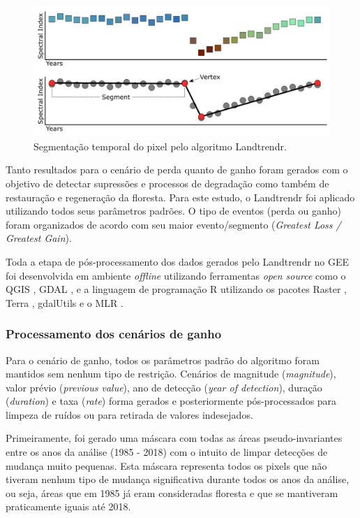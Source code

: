\begin{figure}[h!]
    \centering
    \includegraphics[scale=.8]{images/landtrendr_graphic.png}
    \caption{Segmentação temporal do pixel pelo algoritmo Landtrendr.}
    \label{fig:landtrendr_graph}
\end{figure}

Tanto resultados para o cenário de perda quanto de ganho foram gerados com o objetivo de detectar supressões e processos de degradação como também de restauração e regeneração da floresta. Para este estudo, o Landtrendr foi aplicado utilizando todos seus parâmetros padrões. O tipo de eventos (perda ou ganho) foram organizados de acordo com seu maior evento/segmento (\textit{Greatest Loss / Greatest Gain}).

Toda a etapa de pós-processamento dos dados gerados pelo Landtrendr no GEE foi desenvolvida em ambiente \textit{offline} utilizando ferramentas \textit{open source} como o QGIS \citep{QGIS_software}, GDAL \citep{gdal}, e a linguagem de programação R \citep{Rsoftware} utilizando os pacotes Raster \citep{raster}, Terra \cite{terra}, gdalUtils \citep{gdalutils} e o MLR \citep{mlr}.

\subsubsection{Processamento dos cenários de ganho}

\hspace{13pt} Para o cenário de ganho, todos os parâmetros padrão do algoritmo foram mantidos sem nenhum tipo de restrição. Cenários de magnitude (\textit{magnitude}), valor prévio (\textit{previous value}), ano de detecção (\textit{year of detection}), duração (\textit{duration}) e taxa (\textit{rate}) forma gerados e posteriormente pós-processados para limpeza de ruídos ou para retirada de valores indesejados. 

Primeiramente, foi gerado uma máscara com todas as áreas pseudo-invariantes entre os anos da análise (1985 - 2018) com o intuito de limpar detecções de mudança muito pequenas. Esta máscara representa todos os pixels que não tiveram nenhum tipo de mudança significativa durante todos os anos da análise, ou seja, áreas que em 1985 já eram consideradas floresta e que se mantiveram praticamente iguais até 2018. 

